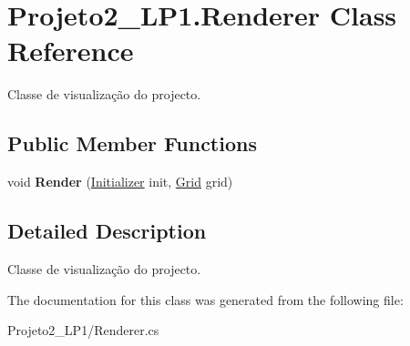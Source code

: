\hypertarget{class_projeto2___l_p1_1_1_renderer}{}\section{Projeto2\+\_\+\+L\+P1.\+Renderer Class Reference}
\label{class_projeto2___l_p1_1_1_renderer}


Classe de visualização do projecto.  


\subsection*{Public Member Functions}
\begin{DoxyCompactItemize}
\item 
\mbox{\label{class_projeto2___l_p1_1_1_renderer_aa7d22be60c14c528697d23100d4ffebf}} 
void {\bfseries Render} (\mbox{\hyperlink{class_projeto2___l_p1_1_1_initializer}{Initializer}} init, \mbox{\hyperlink{class_projeto2___l_p1_1_1_grid}{Grid}} grid)
\end{DoxyCompactItemize}


\subsection{Detailed Description}
Classe de visualização do projecto. 



The documentation for this class was generated from the following file\+:\begin{DoxyCompactItemize}
\item 
Projeto2\+\_\+\+L\+P1/Renderer.\+cs\end{DoxyCompactItemize}
